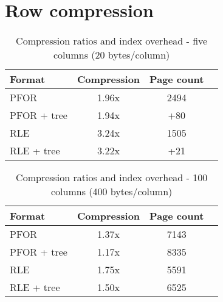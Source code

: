 \documentclass{vldb}
\newcommand{\rows}{Rose\xspace}
\begin{document}

\section{Row compression}

\begin{table}
\caption{Compression ratios and index overhead - five columns (20 bytes/column)}
\centering
\label{table:treeCreation}
\begin{tabular}{|l|c|c|c|} \hline
Format     & Compression & Page count \\ \hline %
PFOR        & 1.96x       & 2494       \\ \hline %
PFOR + tree & 1.94x       & +80        \\ \hline %
RLE        & 3.24x       & 1505 \\ \hline %
RLE + tree & 3.22x       & +21        \\  %
\hline\end{tabular}
\end{table}
\begin{table}
\caption{Compression ratios and index overhead - 100 columns (400 bytes/column)}
\centering
\label{table:treeCreationTwo}
\begin{tabular}{|l|c|c|c|} \hline
Format     & Compression & Page count \\ \hline %
PFOR        & 1.37x       & 7143       \\ \hline %
PFOR + tree & 1.17x       & 8335        \\ \hline %
RLE        & 1.75x       & 5591 \\ \hline %
RLE + tree & 1.50x       & 6525        \\  %

\hline\end{tabular}
\end{table}
\end{document}
